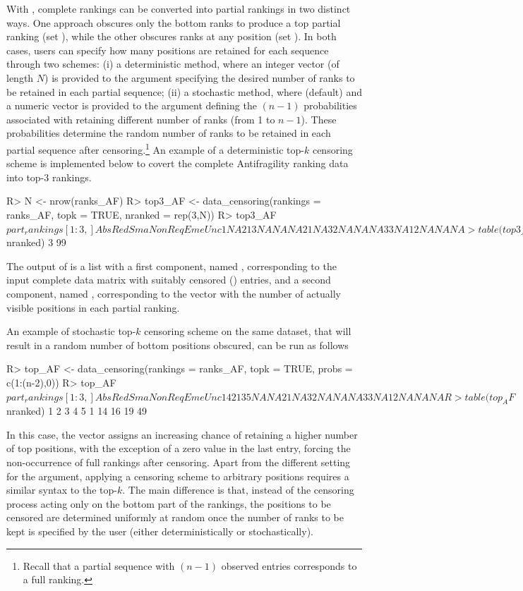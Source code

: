 With , complete rankings can be converted into partial rankings in two distinct ways. One approach obscures only the bottom ranks to produce a top partial ranking (set ), while the other obscures ranks at any position (set ). In both cases, users can specify how many positions are retained for each sequence through two schemes: 
(i) a deterministic method, where an integer vector (of length $N$) is provided to the  argument specifying the desired number of ranks to be retained in each partial sequence; (ii) a stochastic method, where  (default) and a numeric vector is provided to the  argument defining the $(n-1)$ probabilities associated with retaining different number of ranks (from 1 to $n-1$). These probabilities determine the random number of ranks to be retained in each partial sequence after censoring.\footnote{Recall that a partial sequence with $(n-1)$ observed entries corresponds to a full ranking.} An example of a deterministic top-$k$ censoring scheme is implemented below to covert the complete Antifragility ranking data into top-3 rankings.

\begin{example}
R> N <- nrow(ranks_AF)
R> top3_AF <- data_censoring(rankings = ranks_AF, topk = TRUE, nranked = rep(3,N))
R> top3_AF$part_rankings[1:3,]
  Abs Red Sma Non Req Eme Unc
1  NA   2   1   3  NA  NA  NA
2   1  NA   3   2  NA  NA  NA
3   3  NA   1   2  NA  NA  NA
> table(top3_AF$nranked)
 3 
99
\end{example}
The output of  is a list with a first component, named , corresponding to the input complete data matrix  with suitably censored () entries, and a second component, named , corresponding to the vector with the number of actually visible positions in each partial ranking.

An example of stochastic top-$k$ censoring scheme on the same dataset, that will result in a random number of bottom positions obscured, can be run as follows 

\begin{example}
R> top_AF <- data_censoring(rankings = ranks_AF, topk = TRUE, probs = c(1:(n-2),0))
R> top_AF$part_rankings[1:3,]
  Abs Red Sma Non Req Eme Unc
1   4   2   1   3   5  NA  NA
2   1  NA   3   2  NA  NA  NA
3   3  NA   1   2  NA  NA  NA

R> table(top_AF$nranked)
 1  2  3  4  5 
 1 14 16 19 49 
\end{example}
In this case, the vector  assigns an increasing chance of retaining a higher number of top positions, with the exception of a zero value in the last entry, forcing the non-occurrence of full rankings after censoring. Apart from the different setting for the  argument, applying a censoring scheme to arbitrary positions requires a similar syntax to the top-$k$. The main difference is that, instead of the censoring process acting only on the bottom part of the rankings, the positions to be censored are determined uniformly at random once the number of ranks to be kept is specified by the user (either deterministically or stochastically).

